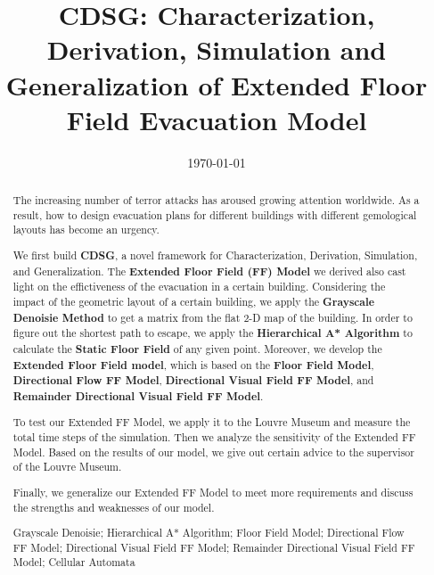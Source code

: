\documentclass{mcmthesis}
\begin{document}
\linespread{0.8} 
\setlength{\parskip}{0.5\baselineskip} 
\title{CDSG: Characterization, Derivation, Simulation and Generalization of Extended Floor Field Evacuation Model}
\author{}
\date{\today}
    \begin{abstract}
        The increasing number of terror attacks has aroused growing attention worldwide. As a result, how to  design evacuation plans for different buildings with different gemological layouts has become an urgency.

		We first build \textbf{CDSG}, a novel framework for Characterization, Derivation, Simulation, and Generalization. The \textbf{Extended Floor Field (FF) Model} we derived also cast light on the effictiveness of the evacuation in a certain building. Considering the impact of the geometric layout of a certain building, we apply the \textbf{Grayscale Denoisie Method} to get a matrix from the flat 2-D map of the building. In order to figure out the shortest path to escape, we apply the	\textbf{Hierarchical A* Algorithm} to calculate the \textbf{Static Floor Field} of any given point. Moreover, we develop the \textbf{Extended Floor Field model}, which is based on the \textbf{Floor Field Model}, \textbf{Directional Flow FF Model}, \textbf{Directional Visual Field FF Model}, and \textbf{Remainder Directional Visual Field FF Model}.
		
		To test our Extended FF Model, we apply it to the Louvre Museum and measure the total time steps of the simulation. Then we analyze the sensitivity of the Extended FF Model. Based on the results of our model, we give out certain advice to the supervisor of the Louvre Museum.

		Finally, we generalize our Extended FF Model to meet more requirements and discuss the strengths and weaknesses of our model.
		\begin{keywords}
			Grayscale Denoisie;
			Hierarchical A* Algorithm;
			Floor Field Model;
			Directional Flow FF Model;
			Directional Visual Field FF Model;
			Remainder Directional Visual Field FF Model;
			Cellular Automata
		\end{keywords}

	\end{abstract}

\maketitle


\newpage
\tableofcontents

\newpage
\end{document}
